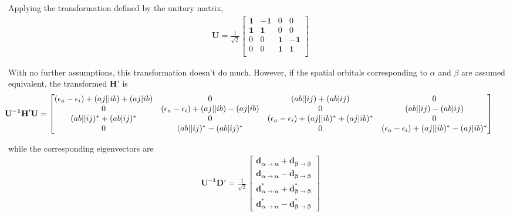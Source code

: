 \documentclass{revtex4}
\newcommand{\Ap}{\textcolor{myred}{\left(aj|ib\right)}}
\newcommand{\Aa}{\textcolor{myred}{\left(aj||ib\right)}}
\newcommand{\B}{\textcolor{myblue}{\left(ab|ij\right)}}
\newcommand{\Ba}{\textcolor{myblue}{\left(ab||ij\right)}}
\newcommand{\AtoA}{\mathbf{\alpha\rightarrow\alpha}}
\newcommand{\BtoB}{\mathbf{\beta\rightarrow\beta}}
\newcommand{\e}{\textcolor{myred}{\left(\epsilon_a-\epsilon_i\right)}}
\begin{document}
Applying the transformation defined by the unitary matrix, 
\begin{eqnarray}
  \mathbf{U} = \frac{1}{\sqrt{2}} 
  \begin{bmatrix}
    \mathbf{1} & -\mathbf{1} & 0 &  0 \\
    \mathbf{1} &  \mathbf{1} & 0 &  0 \\
    0 &  0 & \mathbf{1} & -\mathbf{1} \\
    0 &  0 & \mathbf{1} &  \mathbf{1} \\
  \end{bmatrix}
\end{eqnarray}

With no further assumptions, this transformation doesn't do much. However, if the spatial
orbitals corresponding to $\alpha$ and $\beta$ are assumed equivalent, the 
transformed $\mathbf{H}'$ is
\begin{eqnarray*}
  \hspace{-1cm}
  \mathbf{U^{-1}H'U} =
  \begin{bmatrix}
    \e + \Aa + \Ap & 0              & \Ba + \B            & 0            \\
    0                    & \e + \Aa - \Ap    & 0                & \Ba - \B              \\
    \Ba^* + \B^*         & 0                & \e+ \Aa^* + \Ap^*   & 0                     \\
    0                    & \Ba^* - \B^*     & 0                 & \e+ \Aa^* - \Ap^*  \\
  \end{bmatrix}
\end{eqnarray*}

while the corresponding eigenvectors are 
\begin{eqnarray*}
  \mathbf{U^{-1}D'} = \frac{1}{\sqrt{2}}
  \begin{bmatrix}
    \mathbf{d_\AtoA + d_\BtoB} \\
    \mathbf{d_\AtoA - d_\BtoB} \\
    \mathbf{d^*_\AtoA + d^*_\BtoB} \\        
    \mathbf{d^*_\AtoA - d^*_\BtoB} 
  \end{bmatrix}
\end{eqnarray*}
\end{document}
